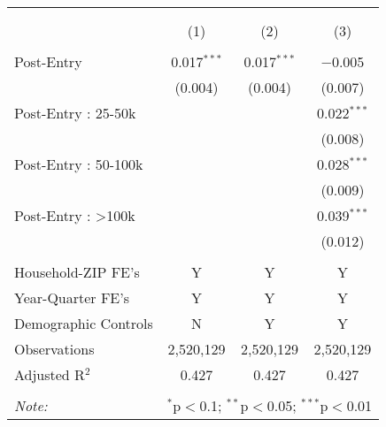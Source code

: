 
\begin{table}[!htbp] \centering 
  \caption{} 
  \label{} 
\begin{tabular}{@{\extracolsep{5pt}}lccc} 
\\[-1.8ex]\hline 
\hline \\[-1.8ex] 
\\[-1.8ex] & (1) & (2) & (3)\\ 
\hline \\[-1.8ex] 
 Post-Entry & 0.017$^{***}$ & 0.017$^{***}$ & $-$0.005 \\ 
  & (0.004) & (0.004) & (0.007) \\ 
  Post-Entry : 25-50k &  &  & 0.022$^{***}$ \\ 
  &  &  & (0.008) \\ 
  Post-Entry : 50-100k &  &  & 0.028$^{***}$ \\ 
  &  &  & (0.009) \\ 
  Post-Entry : >100k &  &  & 0.039$^{***}$ \\ 
  &  &  & (0.012) \\ 
 \hline \\[-1.8ex] 
Household-ZIP FE's & Y & Y & Y \\ 
Year-Quarter FE's & Y & Y & Y \\ 
Demographic Controls & N & Y & Y \\ 
Observations & 2,520,129 & 2,520,129 & 2,520,129 \\ 
Adjusted R$^{2}$ & 0.427 & 0.427 & 0.427 \\ 
\hline 
\hline \\[-1.8ex] 
\textit{Note:}  & \multicolumn{3}{l}{$^{*}$p$<$0.1; $^{**}$p$<$0.05; $^{***}$p$<$0.01} \\ 
\end{tabular} 
\end{table} 
